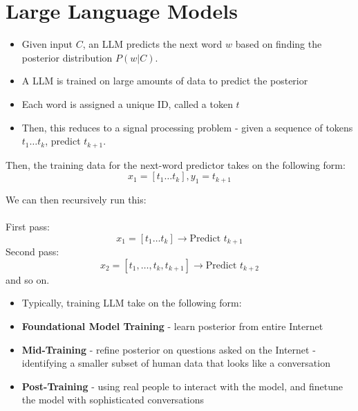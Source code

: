 \documentclass{article}
\begin{document}
\section{Large Language Models}
\begin{itemize}
    \item Given input $C$, an LLM predicts the next word $w$ based on finding the posterior distribution $P(w|C)$.
    \item A LLM is trained on large amounts of data to predict the posterior
    \item Each word is assigned a unique ID, called a token $t$
    \item Then, this reduces to a signal processing problem - given a sequence of tokens $t_1 \dots t_k$, predict $t_{k+1}$.
\end{itemize}
Then, the training data for the next-word predictor takes on the following form:
\[
    x_1 = [t_1 \dots t_k], y_1 = t_{k+1}
\]

We can then recursively run this: \\
\\
First pass:
\[
    x_1 = [t_1 \dots t_k] \rightarrow \text{Predict } t_{k+1}
\]
Second pass:
\[
    x_2 = [t_1, \dots, t_k, t_{k+1}] \rightarrow \text{Predict } t_{k+2}
\]
and so on.

\begin{itemize}
    \item Typically, training LLM take on the following form:
    \item \textbf{Foundational Model Training} - learn posterior from entire Internet
    \item \textbf{Mid-Training} - refine posterior on questions asked on the Internet - identifying a smaller subset of human data that looks like a conversation
    \item \textbf{Post-Training} - using real people to interact with the model, and finetune the model with sophisticated conversations
\end{itemize}
\end{document}
